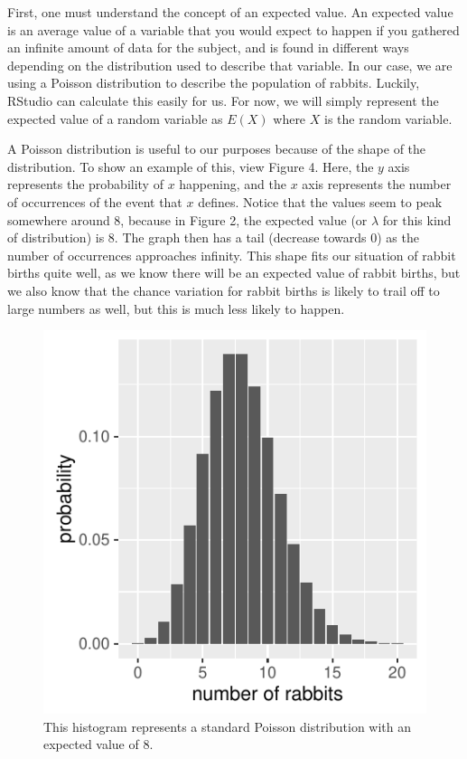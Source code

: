 \documentclass{article}\usepackage[]{graphicx}\usepackage[]{color}
\makeatletter
\def\maxwidth{ %
  \ifdim\Gin@nat@width>\linewidth
    \linewidth
  \else
    \Gin@nat@width
  \fi
}
\newenvironment{knitrout}{}{} %
\makeatother
\begin{document}
First, one must understand the concept of an expected value. An expected value is an average value of a variable that you would expect to happen if you gathered an infinite amount of data for the subject, and is found in different ways depending on the distribution used to describe that variable. In our case, we are using a Poisson distribution to describe the population of rabbits. Luckily, RStudio can calculate this easily for us. For now, we will simply represent the expected value of a random variable as \(E(X)\) where \(X\) is the random variable. 

A Poisson distribution is useful to our purposes because of the shape of the distribution. To show an example of this, view Figure 4. Here, the \(y\) axis represents the probability of \(x\) happening, and the \(x\) axis represents the number of occurrences of the event that \(x\) defines. Notice that the values seem to peak somewhere around 8, because in Figure 2, the expected value (or \(\lambda\) for this kind of distribution) is 8. The graph then has a tail (decrease towards 0) as the number of occurrences approaches infinity. This shape fits our situation of rabbit births quite well, as we know there will be an expected value of rabbit births, but we also know that the chance variation for rabbit births is likely to trail off to large numbers as well, but this is much less likely to happen. 

\begin{figure}
\begin{knitrout}
\color{fgcolor}

{\centering \includegraphics[width=\maxwidth]{figure/unnamed-chunk-5-1} 

}



\end{knitrout}
\caption{This histogram represents a standard Poisson distribution with an expected value of 8.}
\end{figure}
\end{document}
